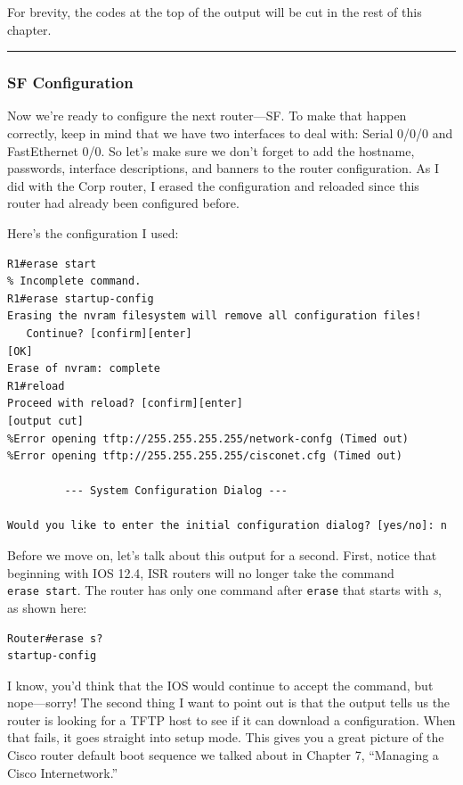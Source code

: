 For brevity, the codes at the top of
the output will be cut in the rest of this chapter.

\begin{center}\rule{0.5\linewidth}{0.5pt}\end{center}

\subsubsection[SF
Configuration]{\texorpdfstring{\protect\hypertarget{c09.xhtmlux5cux23c09-sec-7}{}{}SF
Configuration}{SF Configuration}}

Now we're ready to configure the next router---SF. To make that happen
correctly, keep in mind that we have two interfaces to deal with: Serial
0/0/0 and FastEthernet 0/0. So let's make sure we don't forget to add
the hostname, passwords, interface descriptions, and banners to the
router configuration. As I did with the Corp router, I erased the
configuration and reloaded since this router had already been configured
before.

Here's the configuration I used:

\begin{verbatim}
R1#erase start
% Incomplete command.
R1#erase startup-config
Erasing the nvram filesystem will remove all configuration files!
   Continue? [confirm][enter]
[OK]
Erase of nvram: complete
R1#reload
Proceed with reload? [confirm][enter]
[output cut]
%Error opening tftp://255.255.255.255/network-confg (Timed out)
%Error opening tftp://255.255.255.255/cisconet.cfg (Timed out)
 
         --- System Configuration Dialog ---
 
Would you like to enter the initial configuration dialog? [yes/no]: n
\end{verbatim}

Before we move on, let's talk about this output for a second. First,
notice that beginning with IOS 12.4, ISR routers will no longer take the
command \texttt{erase\ start}. The router has only one command after
\texttt{erase} that starts with \emph{s}, as shown here:

\begin{verbatim}
Router#erase s?
startup-config
\end{verbatim}

I know, you'd think that the IOS would continue to accept the command,
but nope---sorry! The second thing I want to point out is that the
output tells us the router is looking for a TFTP host to see if it can
download a configuration. When that fails, it goes straight into setup
mode. This gives you a great picture of the Cisco router default boot
sequence we talked about in Chapter 7, ``Managing a Cisco
Internetwork.''

